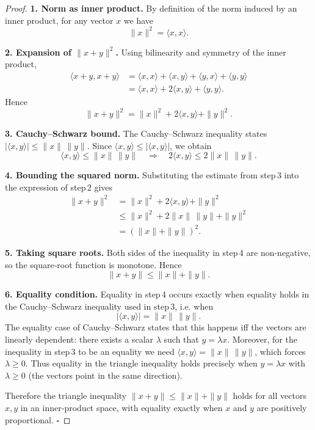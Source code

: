 \begin{proof}
\textbf{1. Norm as inner product.}  
By definition of the norm induced by an inner product, for any vector \(x\) we have  
\[
\|x\|^{2}= \langle x, x\rangle .
\]

\textbf{2. Expansion of \(\|x+y\|^{2}\).}  
Using bilinearity and symmetry of the inner product,
\begin{align*}
\langle x+y, x+y\rangle &= \langle x, x\rangle + \langle x, y\rangle + \langle y, x\rangle + \langle y, y\rangle \\
&= \langle x, x\rangle + 2\langle x, y\rangle + \langle y, y\rangle .
\end{align*}
Hence
\[
\|x+y\|^{2}= \|x\|^{2} + 2\langle x, y\rangle + \|y\|^{2}.
\]

\textbf{3. Cauchy–Schwarz bound.}  
The Cauchy–Schwarz inequality states \(|\langle x, y\rangle| \le \|x\|\,\|y\|\).  
Since \(\langle x, y\rangle \le |\langle x, y\rangle|\), we obtain
\[
\langle x, y\rangle \le \|x\|\,\|y\| \quad\Longrightarrow\quad
2\langle x, y\rangle \le 2\|x\|\,\|y\|.
\]

\textbf{4. Bounding the squared norm.}  
Substituting the estimate from step 3 into the expression of step 2 gives
\begin{align*}
\|x+y\|^{2}
&= \|x\|^{2} + 2\langle x, y\rangle + \|y\|^{2} \\
&\le \|x\|^{2} + 2\|x\|\,\|y\| + \|y\|^{2} \\
&= (\|x\|+\|y\|)^{2}.
\end{align*}

\textbf{5. Taking square roots.}  
Both sides of the inequality in step 4 are non‑negative, so the square‑root function is monotone. Hence
\[
\|x+y\| \le \|x\| + \|y\|.
\]

\textbf{6. Equality condition.}  
Equality in step 4 occurs exactly when equality holds in the Cauchy–Schwarz inequality used in step 3, i.e. when
\[
|\langle x, y\rangle| = \|x\|\,\|y\|.
\]
The equality case of Cauchy–Schwarz states that this happens iff the vectors are linearly dependent: there exists a scalar \(\lambda\) such that \(y = \lambda x\). Moreover, for the inequality in step 3 to be an equality we need \(\langle x, y\rangle = \|x\|\,\|y\|\), which forces \(\lambda \ge 0\). Thus equality in the triangle inequality holds precisely when \(y = \lambda x\) with \(\lambda \ge 0\) (the vectors point in the same direction).

Therefore the triangle inequality \(\|x+y\| \le \|x\|+\|y\|\) holds for all vectors \(x, y\) in an inner‑product space, with equality exactly when \(x\) and \(y\) are positively proportional. \(\square\)
\end{proof}
